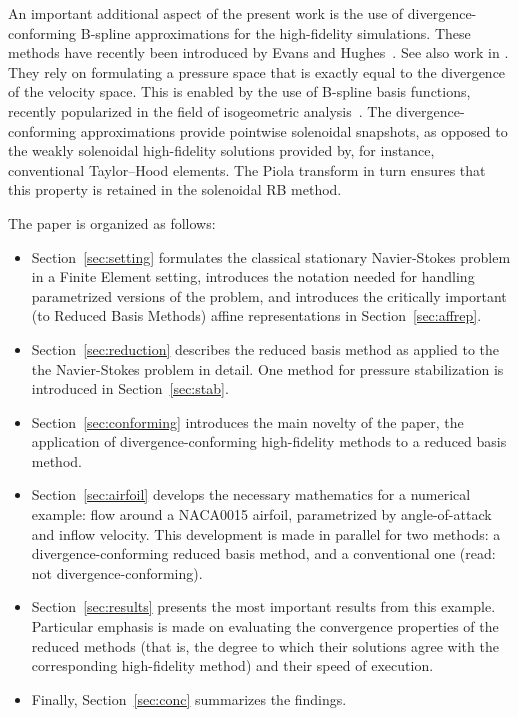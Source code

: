 \documentclass[onecolumn, twoside, a4paper, 11pt]{article}
\begin{document}
An important additional aspect of the present work is the use of divergence-conforming B-spline
approximations for the high-fidelity simulations. These methods have recently been introduced
by Evans and Hughes~\cite{Evans2012dsa,Evans2013idc1,Evans2013idc2,Evans2013idc3}. See also work in
\cite{Buffa2011ias,vanOpstal2017idc}.
They rely on formulating a pressure space that
is exactly equal to the divergence of the velocity space. This is enabled by the use of
B-spline basis functions, recently popularized in the field of isogeometric
analysis~\cite{Cottrell2009iat}. The divergence-conforming approximations provide pointwise
solenoidal snapshots, as opposed to the weakly solenoidal high-fidelity solutions provided by, for
instance, conventional Taylor--Hood elements. The Piola transform in turn ensures that this property
is retained in the solenoidal RB method.

The paper is organized as follows:
\begin{itemize}
\item Section~\ref{sec:setting} formulates the classical stationary
  Navier-Stokes problem in a Finite Element setting, introduces the notation
  needed for handling parametrized versions of the problem, and introduces the
  critically important (to Reduced Basis Methods) affine representations in
  Section~\ref{sec:affrep}.
\item Section~\ref{sec:reduction} describes the reduced basis method as applied
  to the the Navier-Stokes problem in detail. One method for pressure
  stabilization is introduced in Section~\ref{sec:stab}.
\item Section~\ref{sec:conforming} introduces the main novelty of the paper, the
  application of divergence-conforming high-fidelity methods to a reduced basis
  method.
\item Section~\ref{sec:airfoil} develops the necessary mathematics for a
  numerical example: flow around a NACA0015 airfoil, parametrized by
  angle-of-attack and inflow velocity. This development is made in parallel for
  two methods: a divergence-conforming reduced basis method, and a conventional
  one (read: not divergence-conforming).
\item Section~\ref{sec:results} presents the most important results from this
  example. Particular emphasis is made on evaluating the convergence properties
  of the reduced methods (that is, the degree to which their solutions agree
  with the corresponding high-fidelity method) and their speed of execution.
\item Finally, Section~\ref{sec:conc} summarizes the findings.
\end{itemize}
\end{document}
